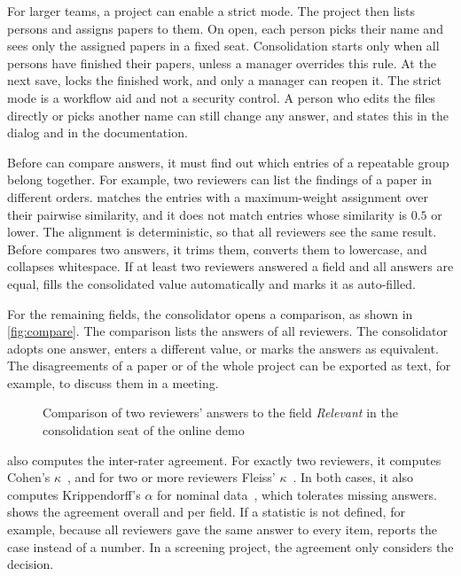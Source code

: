 For larger teams, a project can enable a strict mode.
The project then lists persons and assigns papers to them.
On open, each person picks their name and sees only the assigned papers in a fixed seat.
Consolidation starts only when all persons have finished their papers, unless a manager overrides this rule.
At the next save, \SaiLoR locks the finished work, and only a manager can reopen it.
The strict mode is a workflow aid and not a security control.
A person who edits the files directly or picks another name can still change any answer, and \SaiLoR states this in the dialog and in the documentation.

Before \SaiLoR can compare answers, it must find out which entries of a repeatable group belong together.
For example, two reviewers can list the findings of a paper in different orders.
\SaiLoR matches the entries with a maximum-weight assignment over their pairwise similarity, and it does not match entries whose similarity is $0.5$ or lower.
The alignment is deterministic, so that all reviewers see the same result.
Before \SaiLoR compares two answers, it trims them, converts them to lowercase, and collapses whitespace.
If at least two reviewers answered a field and all answers are equal, \SaiLoR fills the consolidated value automatically and marks it as auto-filled.

For the remaining fields, the consolidator opens a comparison, as shown in \autoref{fig:compare}.
The comparison lists the answers of all reviewers.
The consolidator adopts one answer, enters a different value, or marks the answers as equivalent.
The disagreements of a paper or of the whole project can be exported as text, for example, to discuss them in a meeting.

\begin{figure}[t]
    \centering
    \screenshot{\shotCompare}{\columnwidth}
    \caption{Comparison of two reviewers' answers to the field \emph{Relevant} in the consolidation seat of the online demo}
    \label{fig:compare}
\end{figure}

\SaiLoR also computes the inter-rater agreement.
For exactly two reviewers, it computes Cohen's $\kappa$~\cite{cohen1960coefficient}, and for two or more reviewers Fleiss' $\kappa$~\cite{fleiss1971measuring}.
In both cases, it also computes Krippendorff's $\alpha$ for nominal data~\cite{krippendorff2018content}, which tolerates missing answers.
\SaiLoR shows the agreement overall and per field.
If a statistic is not defined, for example, because all reviewers gave the same answer to every item, \SaiLoR reports the case instead of a number.
In a screening project, the agreement only considers the decision.

